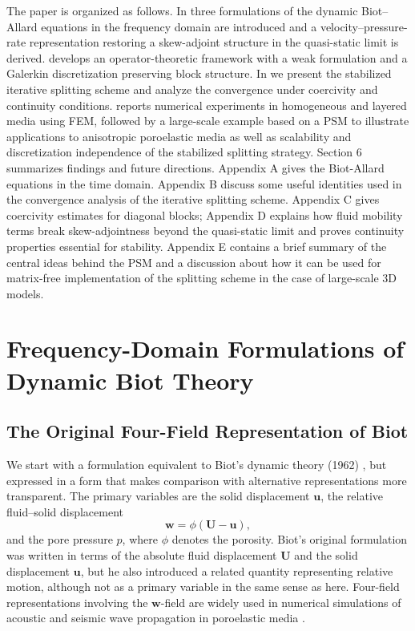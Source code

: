 \documentclass[pdflatex,sn-mathphys-num]{sn-jnl}
\theoremstyle{thmstyleone}%
\theoremstyle{thmstyletwo}%
\theoremstyle{thmstylethree}%
\theoremstyle{definition}
\begin{document}
	The paper is organized as follows. In  three formulations of the dynamic Biot--Allard equations in the frequency domain are introduced and a velocity--pressure-rate representation restoring a skew-adjoint structure in the quasi-static limit is derived.  develops an operator-theoretic framework with a weak formulation and a Galerkin discretization preserving block structure. In  we present the stabilized iterative splitting scheme and analyze the convergence under coercivity and continuity conditions.  reports numerical experiments in homogeneous and layered media using FEM, followed by a large-scale example based on a PSM to illustrate applications to anisotropic poroelastic media as well as scalability and discretization independence of the stabilized splitting strategy. Section 6 \color{black} summarizes findings and future directions. Appendix A gives the Biot-Allard equations in the time domain. Appendix B discuss some useful identities used in the convergence analysis of the iterative splitting scheme. Appendix C gives coercivity estimates for diagonal blocks; Appendix D explains how fluid mobility terms break skew-adjointness beyond the quasi-static limit and proves continuity properties essential for stability.  Appendix E contains a brief summary of the central ideas behind the PSM and a discussion about how it can be used for matrix-free implementation of the splitting scheme in the case of large-scale 3D models.
	
	

	
	\section{Frequency-Domain Formulations of Dynamic Biot Theory}\label{sec: 2}
	
	\subsection{The Original Four-Field Representation of Biot}
	
	
	We start with a formulation equivalent to Biot’s dynamic theory (1962) \cite{Biot1962}, but expressed in a form that makes comparison with alternative representations more transparent. The primary variables are the solid displacement \( \mathbf{u} \), the relative fluid–solid displacement
	\begin{equation}
		\mathbf{w} = \phi(\mathbf{U}-\mathbf{u}),
	\end{equation}
	and the pore pressure \( p \), where \( \phi \) denotes the porosity. Biot’s original formulation was written in terms of the absolute fluid displacement \( \mathbf{U} \) and the solid displacement \( \mathbf{u} \), but he also introduced a related quantity representing relative motion, although not as a primary variable in the same sense as here. Four-field representations involving the \( \mathbf{w} \)-field are widely used in numerical simulations of acoustic and seismic wave propagation in poroelastic media \cite{Carcione2022}.
	
\end{document}
